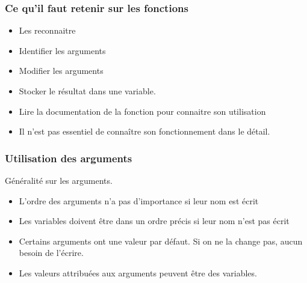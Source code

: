 \documentclass[table,svgnames,hyperref={pdfpagemode=FullScreen}]{beamer}
\begin{document}
\begin{frame}
	\frametitle{Ce qu'il faut retenir sur les fonctions}
	\begin{itemize}
	\item Les reconnaitre
	\item Identifier les arguments 
	\item Modifier les arguments
	\item Stocker le résultat dans une variable.
	\item Lire la documentation de la fonction pour connaitre son utilisation
	\item Il n'est pas essentiel de connaître son fonctionnement dans le détail.  
\end{itemize}
\end{frame}
\begin{frame}
	\frametitle{Utilisation des arguments}
	
	Généralité sur les arguments.
	\begin{itemize}
		\item L'ordre des arguments n'a pas d'importance si leur nom est écrit
		\item  Les variables doivent être dans un ordre précis si leur nom n'est pas écrit
		\item  Certains arguments ont une valeur par défaut. Si on ne la change pas, aucun besoin de l'écrire.
		\item  Les valeurs attribuées aux arguments peuvent être des variables.
	\end{itemize}
	\end{frame}
		
\end{document}
